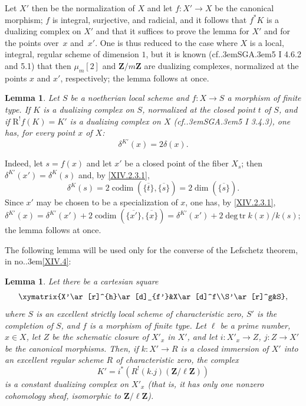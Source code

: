 \documentclass[11pt,a4paper,oneside]{book}
\providecommand{\sisi}[2]{#2}
\providecommand{\pageoriginale}{%
  \refstepcounter{pageoriginal}%
  \marginpar{\raggedright\footnotesize\bfseries\thepageoriginal}%
  \xspace}
\providecommand{\cf}{cf.\kern.3em}
\providecommand{\SGA}{\textup{SGA}\kern.3em}
\providecommand{\numero}{no.\kern.3em}
\providecommand{\ZZ}{\mathbf Z}
\DeclareMathOperator{\degtr}{deg\,tr}
\providecommand{\codim}{\operatorname{codim}}
\providecommand{\R}{\mathrm R}
\let\pageoriginaled\pageoriginale
\theoremstyle{plain}
\newtheorem{sublemme}[subsubsection]{Lemma}
\theoremstyle{definition}
\theoremstyle{remark}
\renewcommand{\Ref}[1]{\textup{\ref{#1}}}
\begin{document}
Let $X'$ then be the normalization of $X$ and let $f:X'\to X$ be the canonical morphism; $f$ is integral, surjective, and radicial, and it follows that $f^*K$ is a dualizing complex on $X'$ and that it suffices to prove the lemma for $X'$ and for the points \sisi{over}{over}~$x$ and~$x'$. One is thus reduced to the case where $X$ is a local, integral, regular scheme of dimension $1$, but it is known (\cf \SGA 5 I 4.6.2 and 5.1) that then $\mu_m[2]$ and $\ZZ/m\ZZ$ are dualizing complexes, normalized at the points $x$ and $x'$, respectively; the lemma follows at once.

\begin{sublemme} \label{XIV.2.3.2} Let $S$ be a noetherian local scheme and $f:X\to S$ a morphism of finite type. If $K$ is a dualizing complex on $S$, normalized at the closed point $t$ of $S$, and if $\R^!f(K)=K'$ is a dualizing complex on $X$ (\cf \SGA 5 I 3.4.3), one has, for every point $x$ of $X$:$$
\delta^{\sisi{K}{{K'}}}(x)=2\delta(x).
$$
\end{sublemme}

Indeed, let $s=f(x)$ and let $x'$ be a closed point of the fiber $X_s$; then $\delta^{K'}(x')=\delta^K(s)$ and, by \Ref{XIV.2.3.1},
$$
\delta^K(s)=2\codim(\overline{\{t\}}, \overline{\{s\}})=2\dim(\overline{\{s\}}).
$$
Since\pageoriginaled $x'$ may be chosen to be a specialization of $x$, one has, by \Ref{XIV.2.3.1},
$$
\delta^{K'}(x)=\delta^{K'}(x')+2\codim(\overline{\{x'\}}, \overline{\{x\}})=\delta^{K'}(x')+2\degtr k(x)/k(s);$$
the lemma follows at once.

The following lemma will be used only for the converse of the Lefschetz theorem, in \numero\Ref{XIV.4}:

\begin{sublemme} \label{XIV.2.3.3}
Let there be a cartesian square
$$
\xymatrix{X'\ar[r]^{h}\ar[d]_{f'}&X\ar[d]^f\\S'\ar[r]^g&S},
$$
where $S$ is an excellent strictly local scheme of characteristic zero, $S'$ is the completion of $S$, and $f$ is a morphism of finite type. Let $\ell$ be a prime number, $x\in X$, let $Z$ be the schematic closure of $X'_x$ in $X'$, and let $i:X'_x\to Z$, $j:Z\to X'$ be the canonical morphisms. Then, if $k:X'\to R$ is a closed immersion of $X'$ into an excellent regular scheme $R$ of characteristic zero, the complex
$$K'=i^*(R^!(k.j)(\ZZ/\ell\ZZ))$$
is a constant dualizing complex on $X'_x$ (that is, it has only one nonzero cohomology sheaf, isomorphic to $\ZZ/\ell\ZZ$).
\end{sublemme}
\end{document}
